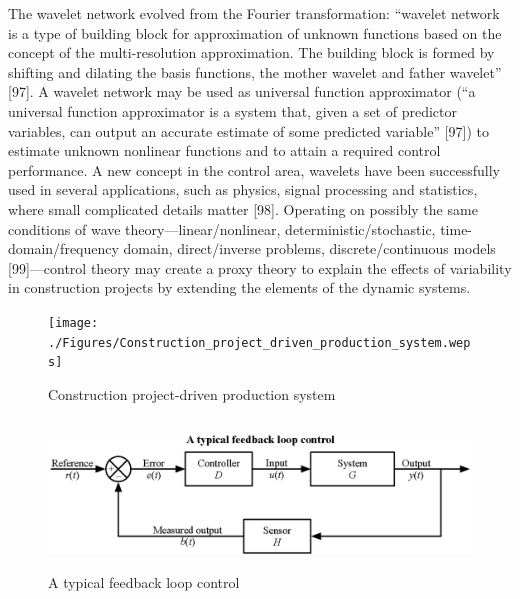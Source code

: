 \documentclass{article}
\begin{document}
\begin{enumerate}
The wavelet network evolved from the Fourier transformation: “wavelet network is a type of building block for approximation of unknown functions based on the concept of the multi-resolution approximation.
The building block is formed by shifting and dilating the basis functions, the mother wavelet and father wavelet” [97].
A wavelet network may be used as universal function approximator (“a universal function approximator is a system that, given a set of predictor variables, can output an accurate estimate of some predicted variable” [97]) to estimate unknown nonlinear functions and to attain a required control performance.
A new concept in the control area, wavelets have been successfully used in several applications, such as physics, signal processing and statistics, where small complicated details matter [98].
Operating on possibly the same conditions of wave theory—linear/nonlinear, deterministic/stochastic, time-domain/frequency domain, direct/inverse problems, discrete/continuous models [99]—control theory may create a proxy theory to explain the effects of variability in construction projects by extending the elements of the dynamic systems.

\begin{figure}[htbp]
\centering
\texttt{[image: ./Figures/Construction\_project\_driven\_production\_system.weps]}
\caption{\label{fig:org4029599}Construction project-driven production system}
\end{figure}

\begin{figure}[htbp]
\centering
\includegraphics[height=150]{./Figures/A_typical_feedback_loop_control.eps}
\caption{\label{fig:orgf94dc0b}A typical feedback loop control}
\end{figure}



\end{enumerate}
\end{document}
